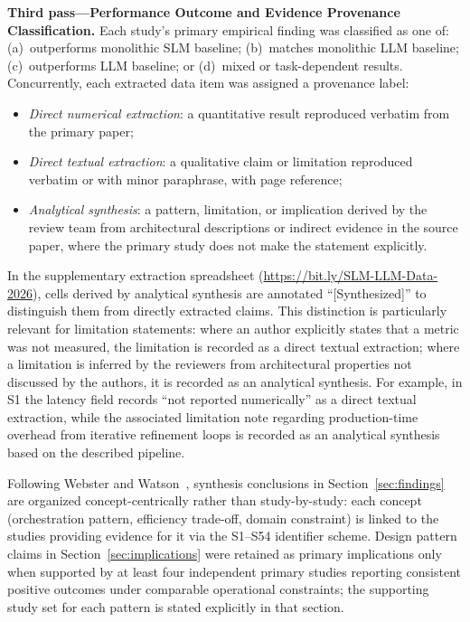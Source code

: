 \textbf{Third pass---Performance Outcome and Evidence Provenance Classification.} Each study's primary empirical finding was classified as one of: (a)~outperforms monolithic SLM baseline; (b)~matches monolithic LLM baseline; (c)~outperforms LLM baseline; or (d)~mixed or task-dependent results. Concurrently, each extracted data item was assigned a provenance label:
\begin{itemize}
    \item \textit{Direct numerical extraction}: a quantitative result reproduced verbatim from the primary paper;
    \item \textit{Direct textual extraction}: a qualitative claim or limitation reproduced verbatim or with minor paraphrase, with page reference;
    \item \textit{Analytical synthesis}: a pattern, limitation, or implication derived by the review team from architectural descriptions or indirect evidence in the source paper, where the primary study does not make the statement explicitly.
\end{itemize}
In the supplementary extraction spreadsheet (\url{https://bit.ly/SLM-LLM-Data-2026}), cells derived by analytical synthesis are annotated ``[Synthesized]'' to distinguish them from directly extracted claims. This distinction is particularly relevant for limitation statements: where an author explicitly states that a metric was not measured, the limitation is recorded as a direct textual extraction; where a limitation is inferred by the reviewers from architectural properties not discussed by the authors, it is recorded as an analytical synthesis. For example, in S1 the latency field records ``not reported numerically'' as a direct textual extraction, while the associated limitation note regarding production-time overhead from iterative refinement loops is recorded as an analytical synthesis based on the described pipeline.

Following Webster and Watson~\cite{webstonwatson2002}, synthesis conclusions in Section~\ref{sec:findings} are organized concept-centrically rather than study-by-study: each concept (orchestration pattern, efficiency trade-off, domain constraint) is linked to the studies providing evidence for it via the S1--S54 identifier scheme. Design pattern claims in Section~\ref{sec:implications} were retained as primary implications only when supported by at least four independent primary studies reporting consistent positive outcomes under comparable operational constraints; the supporting study set for each pattern is stated explicitly in that section.
